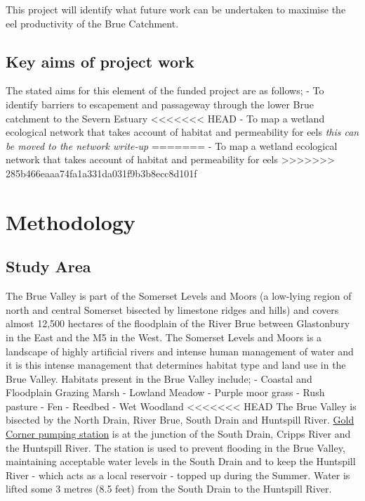 \documentclass[]{article}
\begin{document}
This project will identify what future work can be undertaken to
maximise the eel productivity of the Brue Catchment.

\hypertarget{key-aims-of-project-work}{%
\subsection{Key aims of project work}\label{key-aims-of-project-work}}

The stated aims for this element of the funded project are as follows; -
To identify barriers to escapement and passageway through the lower Brue
catchment to the Severn Estuary
\textless{}\textless{}\textless{}\textless{}\textless{}\textless{}\textless{}
HEAD - To map a wetland ecological network that takes account of habitat
and permeability for eels \emph{this can be moved to the network
write-up} ======= - To map a wetland ecological network that takes
account of habitat and permeability for eels
\textgreater{}\textgreater{}\textgreater{}\textgreater{}\textgreater{}\textgreater{}\textgreater{}
285b466eaaa74fa1a331da031f9b3b8ecc8d101f

\hypertarget{methodology}{%
\section{Methodology}\label{methodology}}

\hypertarget{study-area}{%
\subsection{Study Area}\label{study-area}}

The Brue Valley is part of the Somerset Levels and Moors (a low-lying
region of north and central Somerset bisected by limestone ridges and
hills) and covers almost 12,500 hectares of the floodplain of the River
Brue between Glastonbury in the East and the M5 in the West. The
Somerset Levels and Moors is a landscape of highly artificial rivers and
intense human management of water and it is this intense management that
determines habitat type and land use in the Brue Valley. Habitats
present in the Brue Valley include; - Coastal and Floodplain Grazing
Marsh - Lowland Meadow - Purple moor grass - Rush pasture - Fen -
Reedbed - Wet Woodland
\textless{}\textless{}\textless{}\textless{}\textless{}\textless{}\textless{}
HEAD The Brue Valley is bisected by the North Drain, River Brue, South
Drain and Huntspill River.
\href{http://ea-lit.freshwaterlife.org/archive/ealit:950}{Gold Corner
pumping station} is at the junction of the South Drain, Cripps River and
the Huntspill River. The station is used to prevent flooding in the Brue
Valley, maintaining acceptable water levels in the South Drain and to
keep the Huntspill River - which acts as a local reservoir - topped up
during the Summer. Water is lifted some 3 metres (8.5 feet) from the
South Drain to the Huntspill River.
\end{document}
